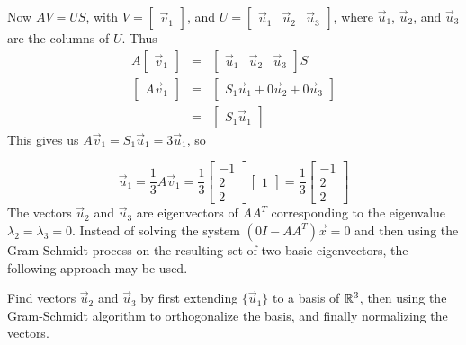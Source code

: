 \documentclass{ximera}
\begin{document}
\begin{example}
\begin{explanation}
\noindent Now $AV=US$, with
$V=\left[\begin{array}{r}\vec{v}_1 \end{array}\right]$,
and $U=\left[\begin{array}{rrr} \vec{u}_1 & \vec{u}_2 & \vec{u}_3 \end{array}\right]$,
where $\vec{u}_1$, $\vec{u}_2$, and $\vec{u}_3$ are the columns of $U$.
Thus
\begin{eqnarray*}
A\left[\begin{array}{r} \vec{v}_1 \end{array}\right]
&=& \left[\begin{array}{rrr} \vec{u}_1 & \vec{u}_2 & \vec{u}_3 \end{array}\right]S\\
\left[\begin{array}{r} A\vec{v}_1 \end{array}\right]
&=& \left[\begin{array}{r} S_1 \vec{u}_1+0\vec{u}_2+0\vec{u}_3 \end{array}\right]\\
&=& \left[\begin{array}{r} S_1 \vec{u}_1 \end{array}\right]
\end{eqnarray*}
This gives us $A\vec{v}_1=S_1 \vec{u}_1= 3\vec{u}_1$, so
 
\[ \vec{u}_1 = \frac{1}{3}A\vec{v}_1
= \frac{1}{3}
\left[\begin{array}{r} -1 \\ 2 \\ 2 \end{array}\right]
\left[\begin{array}{r} 1 \end{array}\right]
= \frac{1}{3}
\left[\begin{array}{r} -1 \\ 2 \\ 2 \end{array}\right]\]
The vectors $\vec{u}_2$ and $\vec{u}_3$ are eigenvectors of $AA^T$ corresponding
to the eigenvalue $\lambda_2=\lambda_3=0$.
Instead of solving the system $(0I-AA^T)\vec{x}= 0$ and then using the
Gram-Schmidt process on the resulting set of
two basic eigenvectors, the following approach may be used.
 
 
Find vectors $\vec{u}_2$ and $\vec{u}_3$ by first extending $\{ \vec{u}_1\}$ to a basis of
$\mathbb{R}^3$, then using the Gram-Schmidt algorithm to orthogonalize the basis,
and finally normalizing the vectors.
 

\end{explanation}
\end{example}
\end{document}
